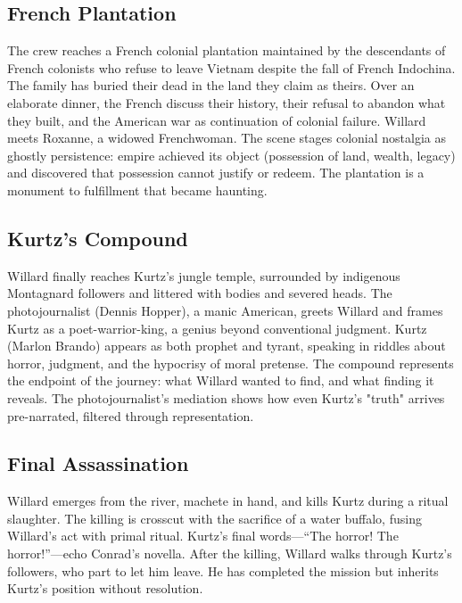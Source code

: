 \begin{minipage}{\textwidth}
	\subsection*{French Plantation}
	\label{scene:french-plantation}

	The crew reaches a French colonial plantation maintained by the descendants of French colonists
	who refuse to leave Vietnam despite the fall of French Indochina. The family has buried their
	dead in the land they claim as theirs. Over an elaborate dinner, the French discuss their
	history, their refusal to abandon what they built, and the American war as continuation of
	colonial failure. Willard meets Roxanne, a widowed Frenchwoman. The scene stages colonial
	nostalgia as ghostly persistence: empire achieved its object (possession of land, wealth,
	legacy) and discovered that possession cannot justify or redeem. The plantation is a monument
	to fulfillment that became haunting.
\end{minipage}

\begin{minipage}{\textwidth}
	\subsection*{Kurtz's Compound}
	\label{scene:kurtz-compound}

	Willard finally reaches Kurtz's jungle temple, surrounded by indigenous Montagnard followers
	and littered with bodies and severed heads. The photojournalist (Dennis Hopper), a manic
	American, greets Willard and frames Kurtz as a poet-warrior-king, a genius beyond conventional
	judgment. Kurtz (Marlon Brando) appears as both prophet and tyrant, speaking in riddles about
	horror, judgment, and the hypocrisy of moral pretense. The compound represents the endpoint of
	the journey: what Willard wanted to find, and what finding it reveals. The photojournalist's
	mediation shows how even Kurtz's "truth" arrives pre-narrated, filtered through representation.
\end{minipage}

\begin{minipage}{\textwidth}
	\subsection*{Final Assassination}
	\label{scene:assassination}

	Willard emerges from the river, machete in hand, and kills Kurtz during a ritual slaughter.
	The killing is crosscut with the sacrifice of a water buffalo, fusing Willard's act with
	primal ritual. Kurtz's final words---``The horror! The horror!''---echo Conrad's novella.
	After the killing, Willard walks through Kurtz's followers, who part to let him leave. He has
	completed the mission but inherits Kurtz's position without resolution.
\end{minipage}
